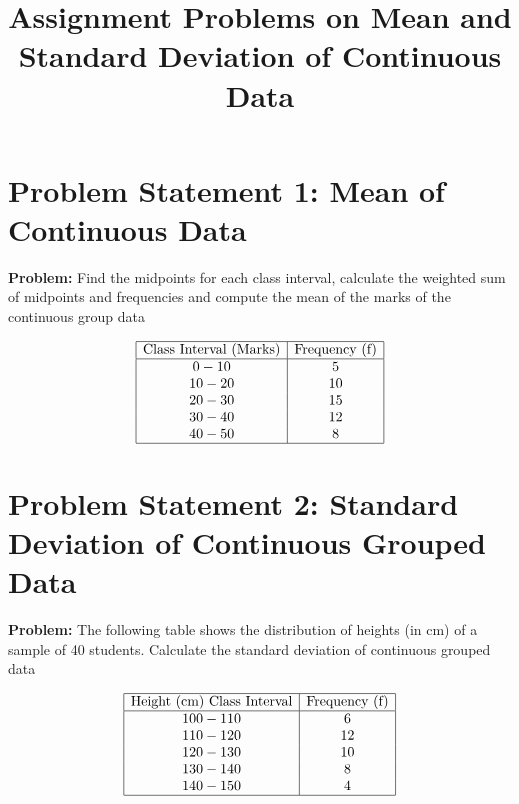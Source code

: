 \documentclass{article}
\begin{document}
\title{Assignment Problems on Mean and Standard Deviation of Continuous Data}
\author{}
\date{}
\maketitle

\section*{Problem Statement 1: Mean of Continuous Data}


\textbf{Problem:} Find the  midpoints for each class interval, calculate the weighted sum of midpoints and frequencies and compute the mean of the marks of the continuous group data



\[
\begin{array}{|c|c|}
\hline
\text{Class Interval (Marks)} & \text{Frequency (f)} \\
\hline
0-10 & 5 \\
10-20 & 10 \\
20-30 & 15 \\
30-40 & 12 \\
40-50 & 8 \\
\hline
\end{array}
\]


\newpage

\section*{Problem Statement 2: Standard Deviation of Continuous Grouped Data}

\textbf{Problem:} The following table shows the distribution of heights (in cm) of a sample of 40 students.  Calculate the standard deviation of continuous grouped data

\[
\begin{array}{|c|c|}
\hline
\text{Height (cm) Class Interval} & \text{Frequency (f)} \\
\hline
100-110 & 6 \\
110-120 & 12 \\
120-130 & 10 \\
130-140 & 8 \\
140-150 & 4 \\
\hline
\end{array}
\]
\end{document}
